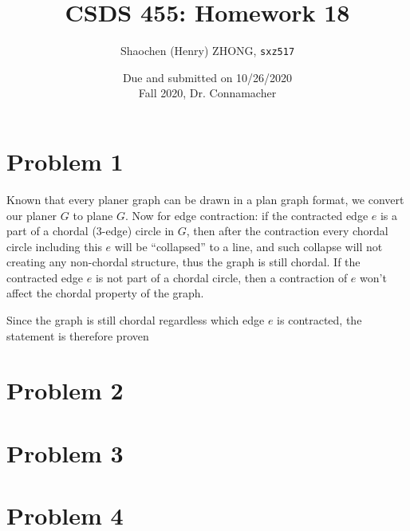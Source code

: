 \documentclass[11pt]{article}
\newcommand{\ilc}{\texttt}
\begin{document}
\title{\textbf{CSDS 455: Homework 18}}

\author{Shaochen (Henry) ZHONG, \ilc{sxz517}}
\date{Due and submitted on 10/26/2020 \\ Fall 2020, Dr. Connamacher}
\maketitle


\section*{Problem 1}

Known that every planer graph can be drawn in a plan graph format, we convert our planer $G$ to plane $G$. Now for edge contraction: if the contracted edge $e$ is a part of a chordal (3-edge) circle in $G$, then after the contraction every chordal circle including this $e$ will be ``collapsed'' to a line, and such collapse will not creating any non-chordal structure, thus the graph is still chordal. If the contracted edge $e$ is not part of a chordal circle, then a contraction of $e$ won't affect the chordal property of the graph.

Since the graph is still chordal regardless which edge $e$ is contracted, the statement is therefore proven

\section*{Problem 2}
\section*{Problem 3}
\section*{Problem 4}
\end{document}
